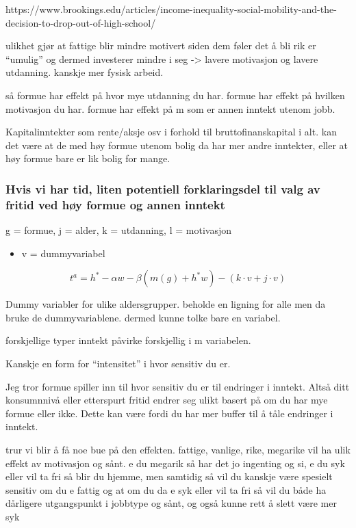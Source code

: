 \documentclass[
  12pt,
  a4paper,
  DIV=11,
  numbers=noendperiod]{scrartcl}
\providecommand{\tightlist}{%
  \setlength{\itemsep}{0pt}\setlength{\parskip}{0pt}}\usepackage{longtable,booktabs,array}
\begin{document}
https://www.brookings.edu/articles/income-inequality-social-mobility-and-the-decision-to-drop-out-of-high-school/

ulikhet gjør at fattige blir mindre motivert siden dem føler det å bli
rik er ``umulig'' og dermed investerer mindre i seg -\textgreater{}
lavere motivasjon og lavere utdanning. kanskje mer fysisk arbeid.

så formue har effekt på hvor mye utdanning du har. formue har effekt på
hvilken motivasjon du har. formue har effekt på m som er annen inntekt
utenom jobb.

Kapitalinntekter som rente/aksje osv i forhold til bruttofinanskapital i
alt. kan det være at de med høy formue utenom bolig da har mer andre
inntekter, eller at høy formue bare er lik bolig for mange.

\subsubsection{Hvis vi har tid, liten potentiell forklaringsdel til valg
av fritid ved høy formue og annen
inntekt}\label{hvis-vi-har-tid-liten-potentiell-forklaringsdel-til-valg-av-fritid-ved-huxf8y-formue-og-annen-inntekt}

g = formue, j = alder, k = utdanning, l = motivasjon

\begin{itemize}
\tightlist
\item
  v = dummyvariabel
\end{itemize}

\[
t^a = h^* - \alpha w - \beta(m(g) + h^*w) - (k\cdot v+j\cdot v)
\]

Dummy variabler for ulike aldersgrupper. beholde en ligning for alle men
da bruke de dummyvariablene. dermed kunne tolke bare en variabel.

forskjellige typer inntekt påvirke forskjellig i m variabelen.

Kanskje en form for ``intensitet'' i hvor sensitiv du er.

Jeg tror formue spiller inn til hvor sensitiv du er til endringer i
inntekt. Altså ditt konsumnnivå eller etterspurt fritid endrer seg ulikt
basert på om du har mye formue eller ikke. Dette kan være fordi du har
mer buffer til å tåle endringer i inntekt.

trur vi blir å få noe bue på den effekten. fattige, vanlige, rike,
megarike vil ha ulik effekt av motivasjon og sånt. e du megarik så har
det jo ingenting og si, e du syk eller vil ta fri så blir du hjemme, men
samtidig så vil du kanskje være spesielt sensitiv om du e fattig og at
om du da e syk eller vil ta fri så vil du både ha dårligere utgangspunkt
i jobbtype og sånt, og også kunne rett å slett være mer syk
\end{document}
